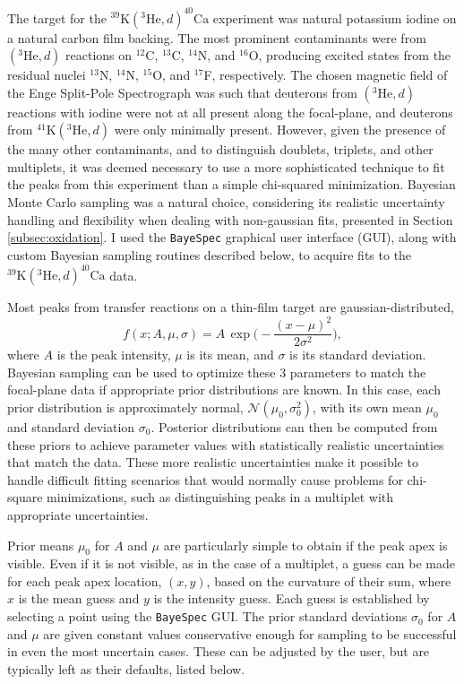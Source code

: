 The target for the $^{39}\mathrm{K}(^{3}\mathrm{He}, d)^{40}\mathrm{Ca}$ experiment was natural potassium iodine on a natural carbon film backing. The most prominent contaminants were from $(^{3}\mathrm{He}, d)$ reactions on $^{12}$C, $^{13}$C, $^{14}$N, and $^{16}$O, producing excited states from the residual nuclei $^{13}$N, $^{14}$N, $^{15}$O, and $^{17}$F, respectively. The chosen magnetic field of the Enge Split-Pole Spectrograph was such that deuterons from $(^{3}\mathrm{He}, d)$ reactions with iodine were not at all present along the focal-plane, and deuterons from $^{41}\mathrm{K}(^{3}\mathrm{He}, d)$ were only minimally present. However, given the presence of the many other contaminants, and to distinguish doublets, triplets, and other multiplets, it was deemed necessary to use a more sophisticated technique to fit the peaks from this experiment than a simple chi-squared minimization. Bayesian Monte Carlo sampling was a natural choice, considering its realistic uncertainty handling and flexibility when dealing with non-gaussian fits, presented in Section \ref{subsec:oxidation}. I used the \texttt{BayeSpec} \cite{BayeSpec} graphical user interface (GUI), along with custom Bayesian sampling routines described below, to acquire fits to the $^{39}\mathrm{K}(^{3}\mathrm{He}, d)^{40}\mathrm{Ca}$ data.

Most peaks from transfer reactions on a thin-film target are gaussian-distributed,
\begin{equation}
    f(x;A,\mu,\sigma) = A \, \exp \Big( -\frac{(x-\mu)^{2}}{2\sigma^{2}} \Big),
\end{equation}
where $A$ is the peak intensity, $\mu$ is its mean, and $\sigma$ is its standard deviation.
Bayesian sampling can be used to optimize these 3 parameters to match the focal-plane data if appropriate prior distributions are known. In this case, each prior distribution is approximately normal, $\mathcal{N}(\mu_{0},\sigma_{0}^{2})$, with its own mean $\mu_{0}$ and standard deviation $\sigma_{0}$. Posterior distributions can then be computed from these priors to achieve parameter values with statistically realistic uncertainties that match the data. These more realistic uncertainties make it possible to handle difficult fitting scenarios that would normally cause problems for chi-square minimizations, such as distinguishing peaks in a multiplet with appropriate uncertainties.

Prior means $\mu_{0}$ for $A$ and $\mu$ are particularly simple to obtain if the peak apex is visible. Even if it is not visible, as in the case of a multiplet, a guess can be made for each peak apex location, $(x,y)$, based on the curvature of their sum, where $x$ is the mean guess and $y$ is the intensity guess. Each guess is established by selecting a point using the \texttt{BayeSpec} GUI. The prior standard deviations $\sigma_{0}$ for $A$ and $\mu$ are given constant values conservative enough for sampling to be successful in even the most uncertain cases. These can be adjusted by the user, but are typically left as their defaults, listed below.


